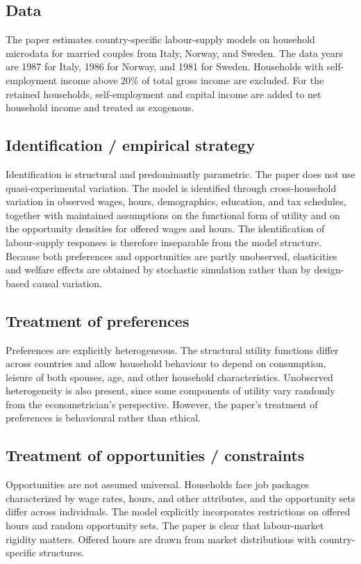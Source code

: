 \documentclass[11pt,a4paper]{article}
\begin{document}
\subsection*{Data}
The paper estimates country-specific labour-supply models on household microdata for married couples from Italy, Norway, and Sweden. The data years are 1987 for Italy, 1986 for Norway, and 1981 for Sweden. Households with self-employment income above 20\% of total gross income are excluded. For the retained households, self-employment and capital income are added to net household income and treated as exogenous.

\subsection*{Identification / empirical strategy}
Identification is structural and predominantly parametric. The paper does not use quasi-experimental variation. The model is identified through cross-household variation in observed wages, hours, demographics, education, and tax schedules, together with maintained assumptions on the functional form of utility and on the opportunity densities for offered wages and hours. The identification of labour-supply responses is therefore inseparable from the model structure. Because both preferences and opportunities are partly unobserved, elasticities and welfare effects are obtained by stochastic simulation rather than by design-based causal variation.

\subsection*{Treatment of preferences}
Preferences are explicitly heterogeneous. The structural utility functions differ across countries and allow household behaviour to depend on consumption, leisure of both spouses, age, and other household characteristics. Unobserved heterogeneity is also present, since some components of utility vary randomly from the econometrician’s perspective. However, the paper’s treatment of preferences is behavioural rather than ethical.

\subsection*{Treatment of opportunities / constraints}
Opportunities are not assumed universal. Households face job packages characterized by wage rates, hours, and other attributes, and the opportunity sets differ across individuals. The model explicitly incorporates restrictions on offered hours and random opportunity sets. The paper is clear that labour-market rigidity matters. Offered hours are drawn from market distributions with country-specific structures.
\end{document}
